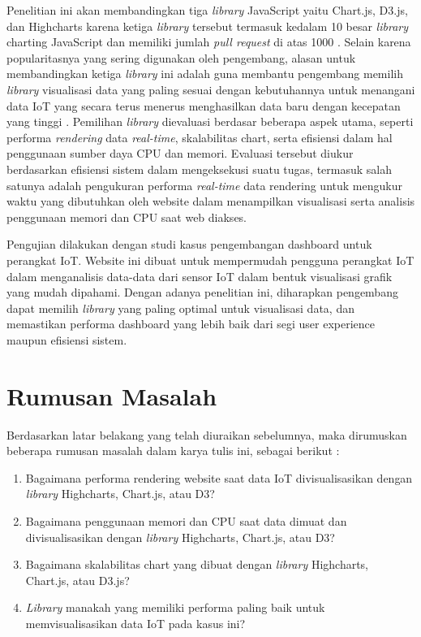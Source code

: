 Penelitian ini  akan membandingkan tiga \textit{library} JavaScript yaitu Chart.js, D3.js, dan Highcharts karena ketiga \textit{library} tersebut termasuk kedalam 10 besar \textit{library} charting JavaScript dan memiliki jumlah \textit{pull request} di atas 1000 \cite{ossinsight}. Selain karena popularitasnya yang sering digunakan oleh pengembang, alasan untuk membandingkan ketiga \textit{library} ini adalah guna membantu pengembang memilih \textit{library} visualisasi data yang paling sesuai dengan kebutuhannya untuk menangani data IoT yang secara terus menerus menghasilkan data baru dengan kecepatan yang tinggi \cite{Khairy2023}. Pemilihan \textit{library} dievaluasi berdasar beberapa aspek utama, seperti performa \textit{rendering} data \textit{real-time}, skalabilitas chart, serta efisiensi dalam hal penggunaan sumber daya CPU dan memori. Evaluasi tersebut diukur berdasarkan efisiensi sistem dalam mengeksekusi suatu tugas, termasuk salah satunya adalah pengukuran performa \textit{real-time} data rendering untuk mengukur waktu yang dibutuhkan oleh website dalam menampilkan visualisasi \cite{Persson2021} serta analisis penggunaan memori dan CPU saat web diakses.

Pengujian dilakukan dengan studi kasus pengembangan dashboard untuk perangkat IoT. Website ini dibuat untuk mempermudah pengguna perangkat IoT dalam menganalisis data-data dari sensor IoT dalam bentuk visualisasi grafik yang mudah dipahami. Dengan adanya penelitian ini, diharapkan pengembang dapat memilih \textit{library} yang paling optimal untuk visualisasi data, dan memastikan performa dashboard yang lebih baik dari segi user experience maupun efisiensi sistem.

\section{Rumusan Masalah}
Berdasarkan latar belakang yang telah diuraikan sebelumnya, maka dirumuskan beberapa rumusan masalah dalam karya tulis ini, sebagai berikut :
\begin{enumerate}
    \item Bagaimana performa rendering website saat data IoT divisualisasikan dengan \textit{library} Highcharts, Chart.js, atau D3? 
    \item Bagaimana penggunaan memori dan CPU saat data dimuat dan divisualisasikan dengan \textit{library} Highcharts, Chart.js, atau D3? 
    \item Bagaimana skalabilitas chart yang dibuat dengan \textit{library} Highcharts, Chart.js, atau D3.js? 
    \item \textit{Library} manakah yang memiliki performa paling baik untuk memvisualisasikan data IoT pada kasus ini? 
\end{enumerate}

